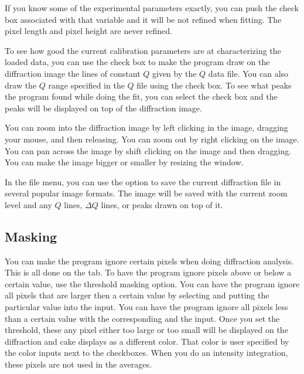 If you know some of the experimental parameters exactly, you
can push the  check box associated with that
variable and it will be not refined when fitting. The pixel 
length and pixel height are never refined.

To see how good the current calibration parameters are at
characterizing the loaded data, you can use the 
 check box to make the program draw
on the diffraction image the lines of constant $Q$ given
by the $Q$ data file. You can also draw the $Q$ range 
specified in the $Q$ file using the  
check box. To see what peaks the program found while doing the 
fit, you can select the  check box and the
peaks will be displayed on top of the diffraction image.

You can zoom into the diffraction image by left clicking
in the image, dragging your mouse, and then releasing.
You can zoom out by right clicking on the image. You can
pan across the image by shift clicking on the image and 
then dragging. You can make the image bigger or smaller 
by resizing the window.

In the file menu, you can use the  option
to save the current diffraction file in several popular
image formats. The image will be saved with the current
zoom level and any $Q$ lines, $\Delta Q$ lines, or peaks
drawn on top of it.

\subsection{Masking}
You can make the program ignore certain pixels when doing
diffraction analysis. This is all done on the 
tab. To have the program ignore pixels above or below a 
certain value, use the threshold masking option.
You can have the program ignore all pixels that are larger 
then a certain value by selecting 
 and putting the particular value
into the  input.
You can have the program ignore all pixels less than a certain
value with the corresponding 
and the  input.
Once you set the threshold, these any pixel either too large
or too small will be displayed on the diffraction and cake
displays as a different color. That color is user 
specified by the color inputs next to the checkboxes. 
When you do an intensity integration, these pixels are 
not used in the averages.

